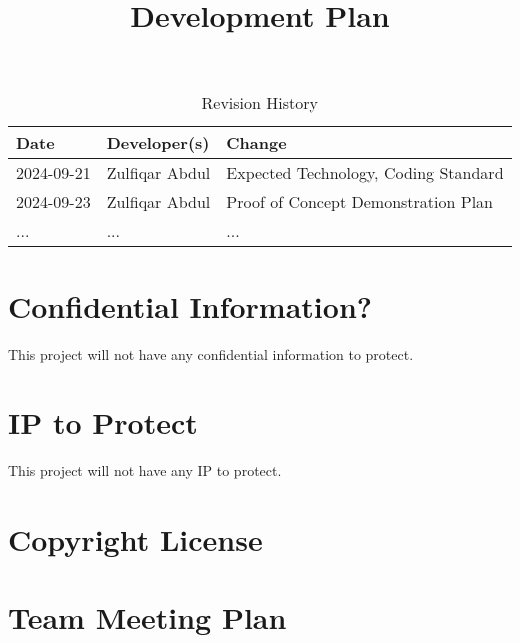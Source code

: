 \documentclass{article}
\title{Development Plan\\\progname}
\author{\authname}
\date{}
\begin{document}
\maketitle

\begin{table}[hp]
\caption{Revision History} \label{TblRevisionHistory}
\begin{tabularx}{\textwidth}{llX}
\toprule
\textbf{Date} & \textbf{Developer(s)} & \textbf{Change}\\
\midrule
2024-09-21 & Zulfiqar Abdul & Expected Technology, Coding Standard\\
2024-09-23 & Zulfiqar Abdul & Proof of Concept Demonstration Plan\\
... & ... & ...\\
\bottomrule
\end{tabularx}
\end{table}

\newpage{}



\section{Confidential Information?}

This project will not have any confidential information to protect.

\section{IP to Protect}

This project will not have any IP to protect.

\section{Copyright License}


\section{Team Meeting Plan}
\end{document}
